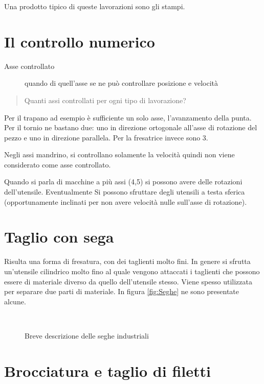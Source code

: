 Una prodotto tipico di queste lavorazioni sono gli stampi.

\section*{Il controllo numerico}
\begin{description}
\item[Asse controllato] quando di quell'asse se ne può controllare posizione e velocità
\end{description}

\begin{quote}
Quanti assi controllati per ogni tipo di lavorazione?
\end{quote}

Per il trapano ad esempio è sufficiente un solo asse, l'avanzamento della punta.
Per il tornio ne bastano due: uno in direzione ortogonale all'asse di rotazione del pezzo e uno in direzione 
parallela.
Per la fresatrice invece sono 3.

Negli assi mandrino, si controllano solamente la velocità quindi non viene considerato come asse controllato.

Quando si parla di macchine a più assi (4,5) si possono avere delle rotazioni dell'utensile.
Eventualmente Si possono sfruttare degli utensili a testa sferica (opportunamente inclinati per non avere 
velocità nulle sull'asse di rotazione).

\section{Taglio con sega}
Risulta una forma di fresatura, con dei taglienti molto fini.
In genere si sfrutta un'utensile cilindrico molto fino al quale vengono
attaccati i taglienti che possono essere di materiale diverso da quello 
dell'utensile stesso.
Viene spesso utilizzata per separare due parti di materiale.
In figura \ref{fig:Seghe} ne sono presentate alcune.

\begin{figure}
\centering
{}\\
\caption{Breve descrizione delle seghe industriali}
\label{fig:SegheInd}
\end{figure}

\section{Brocciatura e taglio di filetti}
